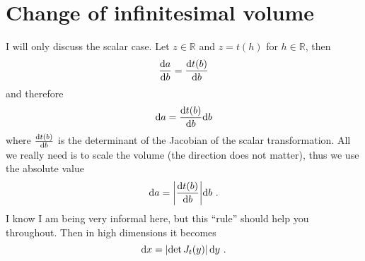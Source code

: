 
\section{Change of infinitesimal volume}

I will only discuss the scalar case. Let $z \in \mathbb R$ and $z = t(h)$ for $h \in \mathbb R$, then
\begin{equation}
    \dv{a}{b} = \dv{t(b)}{b}
\end{equation}
and therefore
\begin{equation}
    \dd a = \dv{t(b)}{b} \dd b
\end{equation}
where $\dv{t(b)}{b}$ is the determinant of the Jacobian of the scalar transformation. 
All we really need is to scale the volume (the direction does not matter), thus we use the absolute value
\begin{equation}
    \dd a = \abs{\dv{t(b)}{b}} \dd b ~.
\end{equation}
I know I am being very informal here, but this ``rule'' should help you throughout. 
Then in high dimensions it becomes
\begin{equation}
    \dd x = \left| \det J_{t}(y) \right| \dd y ~.
\end{equation}
